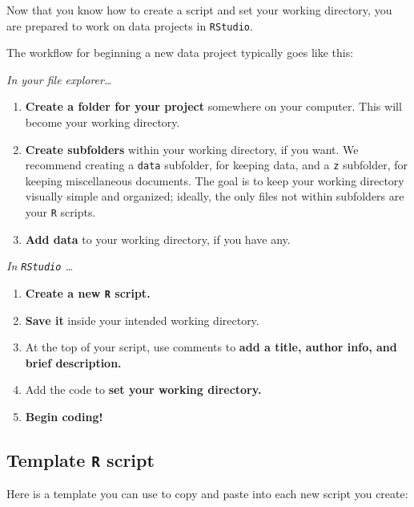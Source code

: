 \documentclass[
]{book}
\begin{document}
Now that you know how to create a script and set your working directory, you are prepared to work on data projects in \texttt{RStudio}.

The workflow for beginning a new data project typically goes like this:

\emph{In your file explorer\ldots{}}

\begin{enumerate}
\def\labelenumi{\arabic{enumi}.}
\item
  \textbf{Create a folder for your project} somewhere on your computer. This will become your working directory.
\item
  \textbf{Create subfolders} within your working directory, if you want. We recommend creating a \texttt{data} subfolder, for keeping data, and a \texttt{z} subfolder, for keeping miscellaneous documents. The goal is to keep your working directory visually simple and organized; ideally, the only files not within subfolders are your \texttt{R} scripts.
\item
  \textbf{Add data} to your working directory, if you have any.
\end{enumerate}

\emph{In \texttt{RStudio} \ldots{}}

\begin{enumerate}
\def\labelenumi{\arabic{enumi}.}
\setcounter{enumi}{3}
\item
  \textbf{Create a new \texttt{R} script.}
\item
  \textbf{Save it} inside your intended working directory.
\item
  At the top of your script, use comments to \textbf{add a title, author info, and brief description.}
\item
  Add the code to \textbf{set your working directory.}
\item
  \textbf{Begin coding!}
\end{enumerate}

\hypertarget{template-r-script}{%
\subsection*{\texorpdfstring{Template \texttt{R} script}{Template R script}}\label{template-r-script}}

Here is a template you can use to copy and paste into each new script you create:
\end{document}
